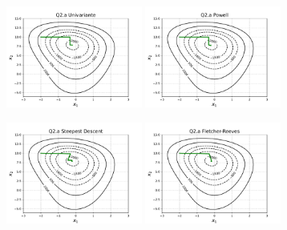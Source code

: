 \documentclass[10pt, a4paper]{article}
\begin{document}
\begin{figure}[H]
  \centering
  \begin{subfigure}[b]{\textwidth}
    \includegraphics[width=0.49\textwidth]{figuras/Q2.a_Univariante_P0=[-2 10].pdf}
    \includegraphics[width=0.49\textwidth]{figuras/Q2.a_Powell_P0=[-2 10].pdf}
  \end{subfigure}
  \begin{subfigure}[b]{\textwidth}
    \includegraphics[width=0.49\textwidth]{figuras/Q2.a_Steepest Descent_P0=[-2 10].pdf}
    \includegraphics[width=0.49\textwidth]{figuras/Q2.a_Fletcher-Reeves_P0=[-2 10].pdf}

\end{subfigure}
\end{figure}
\end{document}
